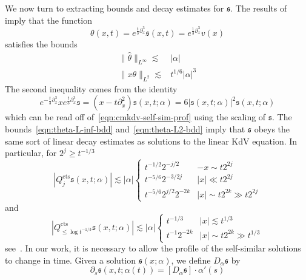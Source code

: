\documentclass[letterpaper, reqno,final]{amsart}
\newcommand{\fs}{\mathfrak{s}}
\newcommand{\tcts}{\text{cts}}
\begin{document}
We now turn to extracting bounds and decay estimates for $\fs$.  The results of~\cite{correiaAsymptoticsFourierSpace2020} imply that the function 
\begin{equation*} 
    \theta(x,t) = e^{\frac{t}{3} \partial_x^3} \fs(x,t) = e^{\frac{1}{3} \partial_x^3} v(x)
\end{equation*}
satisfies the bounds
\begin{align}
    \lVert \hat{\theta} \rVert_{L^\infty} \lesssim& |\alpha|\label{eqn:theta-L-inf-bdd}\\
    \lVert x\theta \rVert_{L^2} \lesssim& t^{1/6} |\alpha|^3\label{eqn:theta-L2-bdd}
\end{align}
The second inequality comes from the identity
\begin{equation}\label{eqn:cmkdv-self-sim-fourier-ident}
    e^{-\frac{t}{3}\partial_x^3}xe^{\frac{t}{3} \partial_x^3} \fs = (x - t \partial_x^2) \fs(x,t;\alpha) = 6|\fs(x,t;\alpha)|^2 \fs(x,t;\alpha)
\end{equation}
which can be read off of~\eqref{eqn:cmkdv-self-sim-prof} using the scaling of $\fs$.  The bounds~\eqref{eqn:theta-L-inf-bdd} and~\eqref{eqn:theta-L2-bdd} imply that $\fs$ obeys the same sort of linear decay estimates as solutions to the linear KdV equation.  In particular, for $2^j \geq t^{-1/3}$
\begin{equation}\label{eqn:fs-decay-bdds}
    |Q_{j}^\tcts \fs(x,t;\alpha)| \lesssim |\alpha|\begin{cases}
        t^{-1/2} 2^{-j/2} & -x \sim t 2^{2j}\\
        t^{-5/6} 2^{-3/2 j} & |x| \ll t 2^{2j}\\
        t^{-5/6} 2^{j/2} 2^{-2k} & |x| \sim t 2^{2k} \gg t 2^{2j}
    \end{cases}
\end{equation}
and
\begin{equation}\label{eqn:fs-decay-bdds-low}
    |Q_{\leq \log t^{-1/3}}^\tcts\fs(x,t;\alpha)| \lesssim |\alpha|\begin{cases}
        t^{-1/3} & |x| \lesssim t^{1/3}\\
        t^{-1} 2^{-2k} & |x| \sim t 2^{2k} \gg t^{1/3}
    \end{cases}
\end{equation}
see~\cite[Section 3]{stewartLongTimeDecay2021}.  In our work, it is necessary to allow the profile of the self-similar solutions to change in time.  Given a solution $\fs(x;\alpha)$, we define $D_\alpha \fs$ by
\begin{equation}\label{eqn:D-alpha-def}
    \partial_s \fs(x,t;\alpha(t)) = [D_\alpha \fs] \cdot \alpha'(s)
\end{equation}
\end{document}
